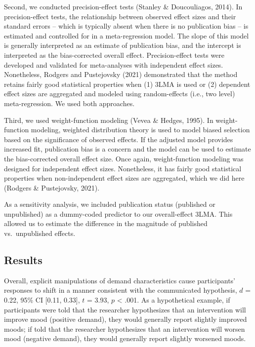 \documentclass[
  man,floatsintext]{apa6}
\begin{document}
Second, we conducted precision-effect tests (Stanley \& Doucouliagos, 2014). In precision-effect tests, the relationship between observed effect sizes and their standard errors -- which is typically absent when there is no publication bias -- is estimated and controlled for in a meta-regression model. The slope of this model is generally interpreted as an estimate of publication bias, and the intercept is interpreted as the bias-corrected overall effect. Precision-effect tests were developed and validated for meta-analyses with independent effect sizes. Nonetheless, Rodgers and Pustejovsky (2021) demonstrated that the method retains fairly good statistical properties when (1) 3LMA is used or (2) dependent effect sizes are aggregated and modeled using random-effects (i.e., two level) meta-regression. We used both approaches.

Third, we used weight-function modeling (Vevea \& Hedges, 1995). In weight-function modeling, weighted distribution theory is used to model biased selection based on the significance of observed effects. If the adjusted model provides increased fit, publication bias is a concern and the model can be used to estimate the bias-corrected overall effect size. Once again, weight-function modeling was designed for independent effect sizes. Nonetheless, it has fairly good statistical properties when non-independent effect sizes are aggregated, which we did here (Rodgers \& Pustejovsky, 2021).

As a sensitivity analysis, we included publication status (published or unpublished) as a dummy-coded predictor to our overall-effect 3LMA. This allowed us to estimate the difference in the magnitude of published vs.~unpublished effects.

\hypertarget{results}{%
\subsection{Results}\label{results}}

Overall, explicit manipulations of demand characteristics cause participants' responses to shift in a manner consistent with the communicated hypothesis, \(d\) = 0.22, 95\% CI {[}0.11, 0.33{]}, \(t\) = 3.93, \(p\) \textless{} .001. As a hypothetical example, if participants were told that the researcher hypothesizes that an intervention will improve mood (positive demand), they would generally report slightly improved moods; if told that the researcher hypothesizes that an intervention will worsen mood (negative demand), they would generally report slightly worsened moods.
\end{document}
